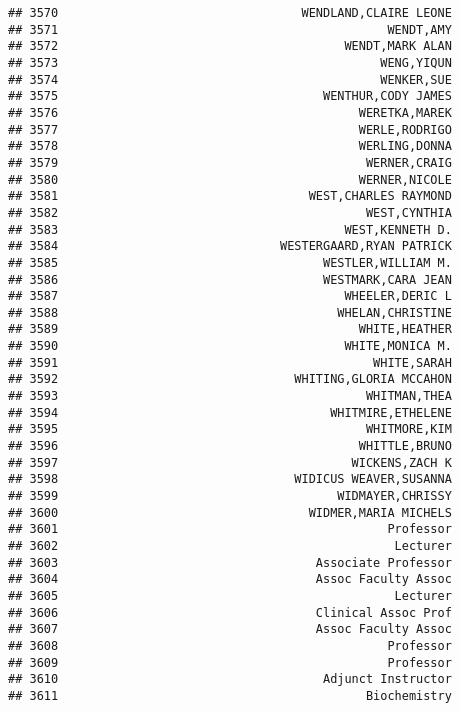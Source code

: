 \documentclass[
]{article}
\begin{document}
\begin{verbatim}
## 3570                                  WENDLAND,CLAIRE LEONE
## 3571                                              WENDT,AMY
## 3572                                        WENDT,MARK ALAN
## 3573                                             WENG,YIQUN
## 3574                                             WENKER,SUE
## 3575                                     WENTHUR,CODY JAMES
## 3576                                          WERETKA,MAREK
## 3577                                          WERLE,RODRIGO
## 3578                                          WERLING,DONNA
## 3579                                           WERNER,CRAIG
## 3580                                          WERNER,NICOLE
## 3581                                   WEST,CHARLES RAYMOND
## 3582                                           WEST,CYNTHIA
## 3583                                        WEST,KENNETH D.
## 3584                               WESTERGAARD,RYAN PATRICK
## 3585                                     WESTLER,WILLIAM M.
## 3586                                     WESTMARK,CARA JEAN
## 3587                                        WHEELER,DERIC L
## 3588                                       WHELAN,CHRISTINE
## 3589                                          WHITE,HEATHER
## 3590                                        WHITE,MONICA M.
## 3591                                            WHITE,SARAH
## 3592                                 WHITING,GLORIA MCCAHON
## 3593                                           WHITMAN,THEA
## 3594                                      WHITMIRE,ETHELENE
## 3595                                           WHITMORE,KIM
## 3596                                          WHITTLE,BRUNO
## 3597                                         WICKENS,ZACH K
## 3598                                 WIDICUS WEAVER,SUSANNA
## 3599                                       WIDMAYER,CHRISSY
## 3600                                   WIDMER,MARIA MICHELS
## 3601                                              Professor
## 3602                                               Lecturer
## 3603                                    Associate Professor
## 3604                                    Assoc Faculty Assoc
## 3605                                               Lecturer
## 3606                                    Clinical Assoc Prof
## 3607                                    Assoc Faculty Assoc
## 3608                                              Professor
## 3609                                              Professor
## 3610                                     Adjunct Instructor
## 3611                                           Biochemistry

\end{verbatim}
\end{document}
